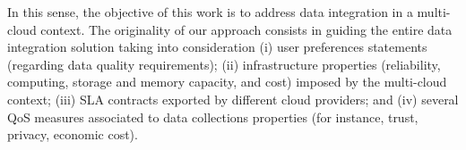 
In this sense, the objective of this work is to address data integration in a multi-cloud context. 
The originality of our approach consists in guiding the entire data integration solution taking into consideration
(i) user preferences statements (regarding data quality requirements); 
(ii) infrastructure properties (reliability, computing, storage and memory capacity, and cost) imposed by the multi-cloud context; 
(iii) SLA contracts exported by different cloud providers; and 
(iv) several QoS measures associated to data collections properties (for instance, trust, privacy, economic cost).


